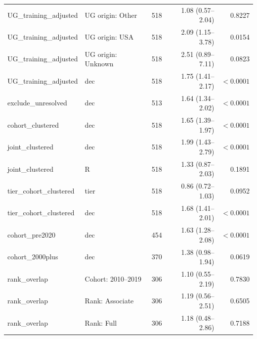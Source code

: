 \begin{tabular}{lllrr}
UG\_training\_adjusted & UG origin: Other & 518 & 1.08 (0.57--2.04) & 0.8227 \\
UG\_training\_adjusted & UG origin: USA & 518 & 2.09 (1.15--3.78) & 0.0154 \\
UG\_training\_adjusted & UG origin: Unknown & 518 & 2.51 (0.89--7.11) & 0.0823 \\
UG\_training\_adjusted & dec & 518 & 1.75 (1.41--2.17) & $<0.0001$ \\
exclude\_unresolved & dec & 513 & 1.64 (1.34--2.02) & $<0.0001$ \\
cohort\_clustered & dec & 518 & 1.65 (1.39--1.97) & $<0.0001$ \\
joint\_clustered & dec & 518 & 1.99 (1.43--2.79) & $<0.0001$ \\
joint\_clustered & R & 518 & 1.33 (0.87--2.03) & 0.1891 \\
tier\_cohort\_clustered & tier & 518 & 0.86 (0.72--1.03) & 0.0952 \\
tier\_cohort\_clustered & dec & 518 & 1.68 (1.41--2.01) & $<0.0001$ \\
cohort\_pre2020 & dec & 454 & 1.63 (1.28--2.08) & $<0.0001$ \\
cohort\_2000plus & dec & 370 & 1.38 (0.98--1.94) & 0.0619 \\
rank\_overlap & Cohort: 2010--2019 & 306 & 1.10 (0.55--2.19) & 0.7830 \\
rank\_overlap & Rank: Associate & 306 & 1.19 (0.56--2.51) & 0.6505 \\
rank\_overlap & Rank: Full & 306 & 1.18 (0.48--2.86) & 0.7188 \\
\bottomrule
\end{tabular}
